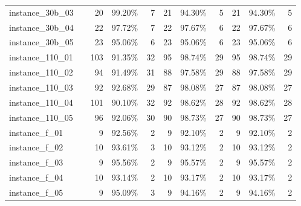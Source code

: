 \documentclass[12pt,a4paper,openright,twoside]{book}
\begin{document}
\begin{table}[H]
{\begin{tabular}{|ll|rrr|rrr|rrr|}
instance\_30b\_03              &     &   20   &  99.20\%  &   7    &   21  &    94.30\%  &   5   &   21  &   94.30\%  &   5  \\   
instance\_30b\_04              &     &   22   &  97.72\%  &   7    &   22  &    97.67\%  &   6   &   22  &   97.67\%  &   6  \\   
instance\_30b\_05              &     &   23   &  95.06\%  &   6    &   23  &    95.06\%  &   6   &   23  &   95.06\%  &   6  \\   
instance\_110\_01             &     &   103  &  91.35\%  &   32   &   95  &    98.74\%  &   29  &   95  &   98.74\%  &   29  \\     
instance\_110\_02             &     &   94   &  91.49\%  &   31   &   88  &    97.58\%  &   29  &   88  &   97.58\%  &   29  \\     
instance\_110\_03             &     &   92   &  92.68\%  &   29   &   87  &    98.08\%  &   27  &   87  &   98.08\%  &   27  \\     
instance\_110\_04             &     &   101  &  90.10\%  &   32   &   92  &    98.62\%  &   28  &   92  &   98.62\%  &   28  \\     
instance\_110\_05             &     &   96   &  92.06\%  &   30   &   90  &    98.73\%  &   27  &   90  &   98.73\%  &   27  \\ 
instance\_f\_01               &     &   9    &  92.56\%  &   2    &   9   &    92.10\%  &   2   &   9   &   92.10\%  &   2  \\   
instance\_f\_02               &     &   10   &  93.61\%  &   3    &   10  &    93.12\%  &   2   &   10  &   93.12\%  &   2  \\   
instance\_f\_03               &     &   9    &  95.56\%  &   2    &   9   &    95.57\%  &   2   &   9   &   95.57\%  &   2  \\   
instance\_f\_04               &     &   10   &  93.14\%  &   2    &   10  &    93.17\%  &   2   &   10  &   93.17\%  &   2  \\   
instance\_f\_05               &     &   9    &  95.09\%  &   3    &   9   &    94.16\%  &   2   &   9   &   94.16\%  &   2  \\ 
 \hline
\end{tabular}
}
\end{table}
\end{document}
